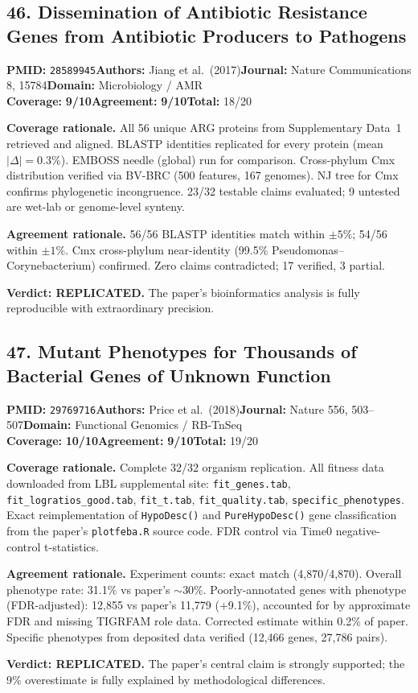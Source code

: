 \documentclass[11pt]{article}
\newcommand{\scorebadge}[2]{\textbf{#1:} \textbf{#2/10}}
\begin{document}
\subsection{46. Dissemination of Antibiotic Resistance Genes from Antibiotic Producers to Pathogens}
\textbf{PMID:} \texttt{28589945}\quad\textbf{Authors:} Jiang et al.\ (2017)\quad\textbf{Journal:} Nature Communications 8, 15784\quad\textbf{Domain:} Microbiology / AMR\\
\scorebadge{Coverage}{9}\quad\scorebadge{Agreement}{9}\quad\textbf{Total:} 18/20\par\smallskip
\noindent\textbf{Coverage rationale.} All 56 unique ARG proteins from Supplementary Data~1 retrieved and aligned. BLASTP identities replicated for every protein (mean $|\Delta|=0.3\%$). EMBOSS needle (global) run for comparison. Cross-phylum Cmx distribution verified via BV-BRC (500 features, 167 genomes). NJ tree for Cmx confirms phylogenetic incongruence. 23/32 testable claims evaluated; 9 untested are wet-lab or genome-level synteny.\par
\noindent\textbf{Agreement rationale.} 56/56 BLASTP identities match within $\pm 5\%$; 54/56 within $\pm 1\%$. Cmx cross-phylum near-identity (99.5\% Pseudomonas--Corynebacterium) confirmed. Zero claims contradicted; 17 verified, 3 partial.\par\smallskip
\noindent\textbf{Verdict: REPLICATED.} The paper's bioinformatics analysis is fully reproducible with extraordinary precision.

\subsection{47. Mutant Phenotypes for Thousands of Bacterial Genes of Unknown Function}
\textbf{PMID:} \texttt{29769716}\quad\textbf{Authors:} Price et al.\ (2018)\quad\textbf{Journal:} Nature 556, 503--507\quad\textbf{Domain:} Functional Genomics / RB-TnSeq\\
\scorebadge{Coverage}{10}\quad\scorebadge{Agreement}{9}\quad\textbf{Total:} 19/20\par\smallskip
\noindent\textbf{Coverage rationale.} Complete 32/32 organism replication. All fitness data downloaded from LBL supplemental site: \texttt{fit\_genes.tab}, \texttt{fit\_logratios\_good.tab}, \texttt{fit\_t.tab}, \texttt{fit\_quality.tab}, \texttt{specific\_phenotypes}. Exact reimplementation of \texttt{HypoDesc()} and \texttt{PureHypoDesc()} gene classification from the paper's \texttt{plotfeba.R} source code. FDR control via Time0 negative-control t-statistics.\par
\noindent\textbf{Agreement rationale.} Experiment counts: exact match (4,870/4,870). Overall phenotype rate: 31.1\% vs paper's $\sim$30\%. Poorly-annotated genes with phenotype (FDR-adjusted): 12,855 vs paper's 11,779 (+9.1\%), accounted for by approximate FDR and missing TIGRFAM role data. Corrected estimate within 0.2\% of paper. Specific phenotypes from deposited data verified (12,466 genes, 27,786 pairs).\par\smallskip
\noindent\textbf{Verdict: REPLICATED.} The paper's central claim is strongly supported; the 9\% overestimate is fully explained by methodological differences.
\end{document}
